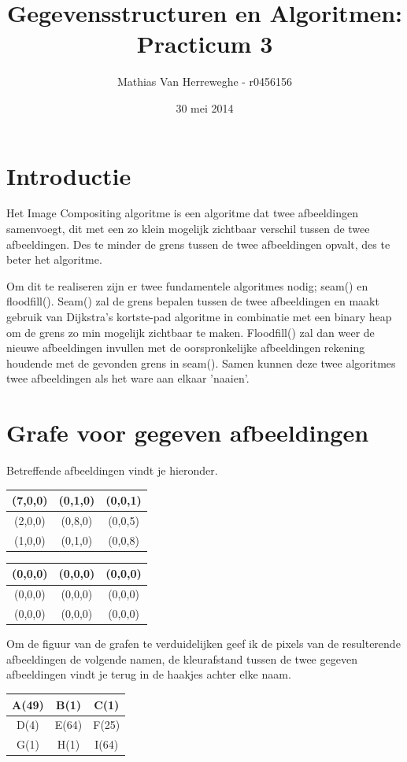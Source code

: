 \documentclass{article}
\title{Gegevensstructuren en Algoritmen: Practicum 3}
\author{Mathias Van Herreweghe - r0456156}
\date{30 mei 2014}
\begin{document}
\maketitle
\newpage
\section{Introductie}
Het Image Compositing algoritme is een algoritme dat twee afbeeldingen samenvoegt, dit met een zo klein mogelijk zichtbaar verschil tussen de twee afbeeldingen. Des te minder de grens tussen de twee afbeeldingen opvalt, des te beter het algoritme.

Om dit te realiseren zijn er twee fundamentele algoritmes nodig; seam() en floodfill().
Seam() zal de grens bepalen tussen de twee afbeeldingen en maakt gebruik van Dijkstra's kortste-pad algoritme in combinatie met een binary heap om de grens zo min mogelijk zichtbaar te maken.
Floodfill() zal dan weer de nieuwe afbeeldingen invullen met de oorspronkelijke afbeeldingen rekening houdende met de gevonden grens in seam().
Samen kunnen deze twee algoritmes twee afbeeldingen als het ware aan elkaar 'naaien'.

\newpage
\section{Grafe voor gegeven afbeeldingen}
Betreffende afbeeldingen vindt je hieronder.

\begin{tabular}{| c | c | c |}
\hline
 (7,0,0) & (0,1,0) & (0,0,1) \\
  \hline
 (2,0,0) & (0,8,0) & (0,0,5) \\
  \hline
  (1,0,0) & (0,1,0) & (0,0,8) \\
  \hline
\end{tabular}

\begin{tabular}{| c | c | c |}
\hline
 (0,0,0) & (0,0,0) & (0,0,0) \\
  \hline
 (0,0,0) & (0,0,0) & (0,0,0) \\
  \hline
  (0,0,0) & (0,0,0) & (0,0,0) \\
  \hline
\end{tabular}

Om de figuur van de grafen te verduidelijken geef ik de pixels van de resulterende afbeeldingen de volgende namen, de kleurafstand tussen de twee gegeven afbeeldingen vindt je terug in de haakjes achter elke naam.

\begin{tabular}{| c | c | c |}
\hline
  A(49) & B(1) & C(1) \\
  \hline
  D(4) & E(64) & F(25) \\
  \hline
  G(1) & H(1)& I(64) \\
  \hline
\end{tabular}
\end{document}
